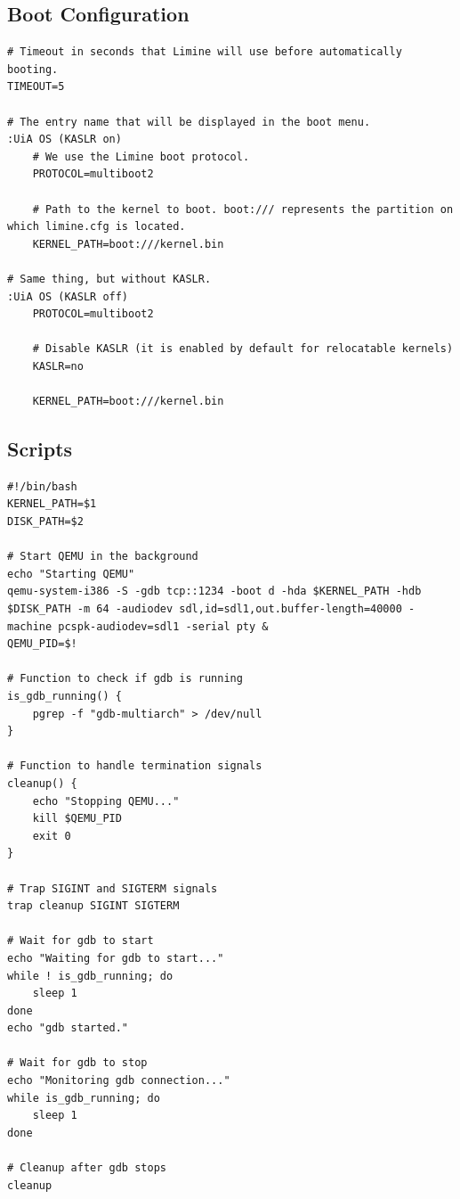 \documentclass[../main.tex]{subfiles}
\begin{document}
\subsection{Boot Configuration}
\label{apx:boot_configuration}


\label{lst:limine_cfg}
\begin{verbatim}
# Timeout in seconds that Limine will use before automatically booting.
TIMEOUT=5
 
# The entry name that will be displayed in the boot menu.
:UiA OS (KASLR on)
    # We use the Limine boot protocol.
    PROTOCOL=multiboot2
 
    # Path to the kernel to boot. boot:/// represents the partition on which limine.cfg is located.
    KERNEL_PATH=boot:///kernel.bin
 
# Same thing, but without KASLR.
:UiA OS (KASLR off)
    PROTOCOL=multiboot2
 
    # Disable KASLR (it is enabled by default for relocatable kernels)
    KASLR=no
 
    KERNEL_PATH=boot:///kernel.bin
\end{verbatim}


\subsection{Scripts}
\label{apx:scripts}


\label{lst:start_qemu_sh}
\begin{verbatim}
#!/bin/bash
KERNEL_PATH=$1
DISK_PATH=$2

# Start QEMU in the background
echo "Starting QEMU"
qemu-system-i386 -S -gdb tcp::1234 -boot d -hda $KERNEL_PATH -hdb $DISK_PATH -m 64 -audiodev sdl,id=sdl1,out.buffer-length=40000 -machine pcspk-audiodev=sdl1 -serial pty &
QEMU_PID=$!

# Function to check if gdb is running
is_gdb_running() {
    pgrep -f "gdb-multiarch" > /dev/null
}

# Function to handle termination signals
cleanup() {
    echo "Stopping QEMU..."
    kill $QEMU_PID
    exit 0
}

# Trap SIGINT and SIGTERM signals
trap cleanup SIGINT SIGTERM

# Wait for gdb to start
echo "Waiting for gdb to start..."
while ! is_gdb_running; do
    sleep 1
done
echo "gdb started."

# Wait for gdb to stop
echo "Monitoring gdb connection..."
while is_gdb_running; do
    sleep 1
done

# Cleanup after gdb stops
cleanup

\end{verbatim}
\end{document}
